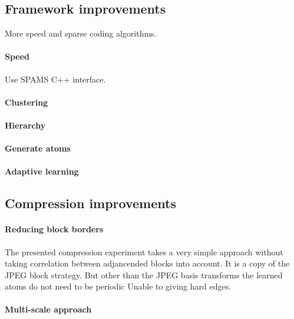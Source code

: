 \subsection{Framework improvements}
More speed and  sparse coding algorithms.
\paragraph{Speed}
Use SPAMS C++ interface.
\paragraph{Clustering}
\paragraph{Hierarchy}
\paragraph{Generate atoms}
\paragraph{Adaptive learning}


\subsection{Compression improvements}
\paragraph{Reducing block borders} The presented compression experiment
takes a very simple approach without taking correlation between adjancended
blocks into account. It is a copy of the JPEG block strategy. But other than
the JPEG basis transforms the learned atoms do not need to be periodic
Unable to giving
hard edges. 


\paragraph{Multi-scale approach}

